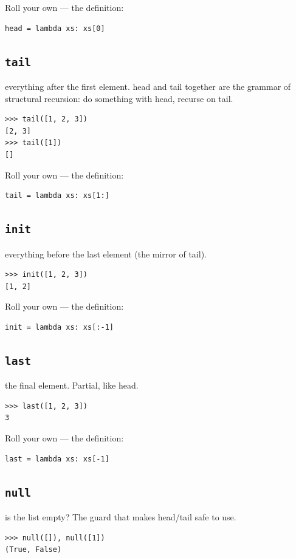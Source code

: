 \documentclass[10pt,letterpaper]{book}
\begin{document}
Roll your own --- the definition:

\begin{lstlisting}[style=ex]
head = lambda xs: xs[0]
\end{lstlisting}

\subsection{\texttt{tail}}\label{def:tail}
everything after the first element. head and tail together are the grammar of structural recursion: do something with head, recurse on tail.
\begin{lstlisting}[style=ex]
>>> tail([1, 2, 3])
[2, 3]
>>> tail([1])
[]
\end{lstlisting}

Roll your own --- the definition:

\begin{lstlisting}[style=ex]
tail = lambda xs: xs[1:]
\end{lstlisting}
\subsection{\texttt{init}}\label{def:init}
everything before the last element (the mirror of tail).
\begin{lstlisting}[style=ex]
>>> init([1, 2, 3])
[1, 2]
\end{lstlisting}

Roll your own --- the definition:

\begin{lstlisting}[style=ex]
init = lambda xs: xs[:-1]
\end{lstlisting}
\subsection{\texttt{last}}\label{def:last}
the final element. Partial, like head.
\begin{lstlisting}[style=ex]
>>> last([1, 2, 3])
3
\end{lstlisting}

Roll your own --- the definition:

\begin{lstlisting}[style=ex]
last = lambda xs: xs[-1]
\end{lstlisting}
\subsection{\texttt{null}}\label{def:null}
is the list empty? The guard that makes head/tail safe to use.
\begin{lstlisting}[style=ex]
>>> null([]), null([1])
(True, False)
\end{lstlisting}
\end{document}

